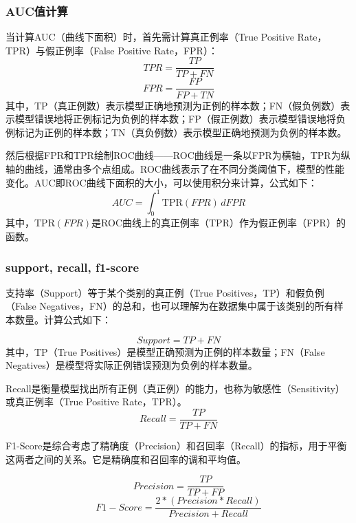 \documentclass[UTF8,12pt]{ctexart}
\begin{document}
	\subsubsection{AUC值计算}
	
	当计算AUC（曲线下面积）时，首先需计算真正例率（True Positive Rate，TPR）与假正例率（False Positive Rate，FPR）：
	\begin{equation}
		TPR = \dfrac{TP}{TP + FN}
	\end{equation}
	\begin{equation}
		FPR = \frac{FP}{FP + TN}
	\end{equation}
	其中，TP（真正例数）表示模型正确地预测为正例的样本数；FN（假负例数）表示模型错误地将正例标记为负例的样本数；FP（假正例数）表示模型错误地将负例标记为正例的样本数；TN（真负例数）表示模型正确地预测为负例的样本数。

	然后根据FPR和TPR绘制ROC曲线——ROC曲线是一条以FPR为横轴，TPR为纵轴的曲线，通常由多个点组成。ROC曲线表示了在不同分类阈值下，模型的性能变化。AUC即ROC曲线下面积的大小，可以使用积分来计算，公式如下：
	\begin{equation}
		AUC = \int_0^1 \text{TPR}(FPR) \, dFPR
	\end{equation}
	其中，$\text{TPR}(FPR)$是ROC曲线上的真正例率（TPR）作为假正例率（FPR）的函数。

	\subsubsection{support, recall, f1-score}
	
	支持率（Support）等于某个类别的真正例（True Positives，TP）和假负例（False Negatives，FN）的总和，也可以理解为在数据集中属于该类别的所有样本数量。计算公式如下：
	
	\begin{equation}
		Support=TP+FN
	\end{equation}
	其中，TP（True Positives）是模型正确预测为正例的样本数量；FN（False Negatives）是模型将实际正例错误预测为负例的样本数量。
	
	
	Recall是衡量模型找出所有正例（真正例）的能力，也称为敏感性（Sensitivity）或真正例率（True Positive Rate，TPR）。
	\begin{equation}
		Recall = \dfrac{TP}{TP + FN}
	\end{equation}
	

	F1-Score是综合考虑了精确度（Precision）和召回率（Recall）的指标，用于平衡这两者之间的关系。它是精确度和召回率的调和平均值。
	
	\begin{equation}
		Precision = \dfrac{TP}{TP + FP}
	\end{equation}
	\begin{equation}
		F1-Score = \dfrac{2 * (Precision * Recall)}{Precision + Recall}
	\end{equation}
	
\end{document}
